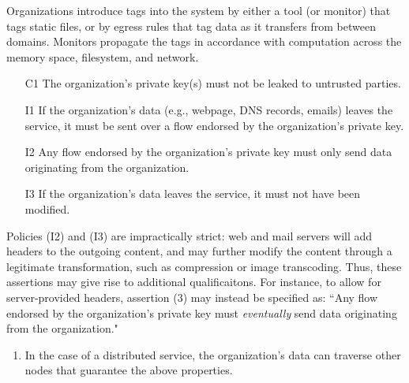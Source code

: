 Organizations introduce tags into the system by either a tool (or monitor) that
tags static files, or by egress rules that tag data as it transfers from
between domains.
%
Monitors propagate the tags in accordance with computation across the memory
space, filesystem, and network.


\begin{enumerate}
    \item[C1]  The organization's private key(s) must not be leaked to untrusted parties.
\end{enumerate}



\begin{enumerate}
    \item[I1] If the organization's data (e.g., webpage, DNS records, emails) leaves the
        service, it must be sent over a flow endorsed by the organization's private
        key.

    \item[I2] Any flow endorsed by the organization's private key must only send
        data originating from the organization.

    \item[I3] If the organization's data leaves the service, it must not have been
        modified.
\end{enumerate}

Policies (I2) and (I3) are impractically strict: web and mail servers will add
headers to the outgoing content, and may further modify the content through a
legitimate transformation, such as compression or image transcoding.
%
Thus, these assertions may give rise to additional qualificaitons.
%
For instance, to allow for server-provided headers, assertion (3) may instead
be specified as: ``Any flow endorsed by the organization's private key must
\emph{eventually} send data originating from the organization."



\begin{enumerate}
    \item In the case of a distributed service, the organization's data can
        traverse other nodes that  guarantee the above properties.
\end{enumerate}




